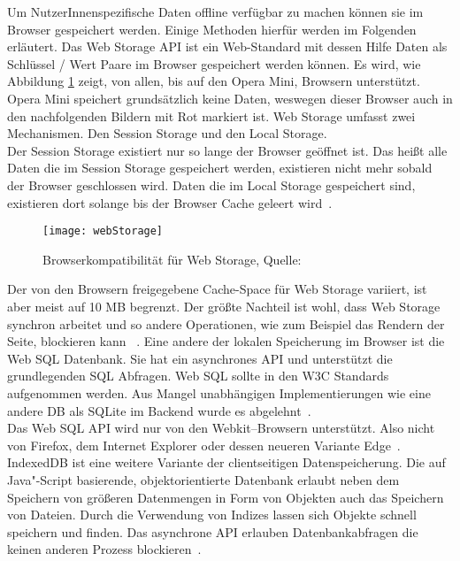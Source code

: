 Um NutzerInnenspezifische Daten offline verfügbar zu machen können sie im Browser gespeichert werden. Einige Methoden hierfür werden im Folgenden erläutert.
%
Das Web Storage \gls{API} ist ein Web-Standard mit dessen Hilfe Daten als Schlüssel / Wert Paare im Browser gespeichert werden können. Es wird, wie Abbildung \ref{fig:webStorage} zeigt, von allen, bis auf den Opera Mini,  Browsern unterstützt. Opera Mini speichert grundsätzlich keine Daten, weswegen dieser Browser auch in den nachfolgenden Bildern mit Rot markiert ist.
Web Storage umfasst zwei Mechanismen. Den Session Storage und den Local Storage.\\
Der Session Storage existiert nur so lange der Browser geöffnet ist.
Das heißt alle Daten die im Session Storage gespeichert werden, existieren nicht mehr sobald der Browser geschlossen wird. Daten die im Local Storage gespeichert sind, existieren dort solange bis der Browser Cache geleert wird~\cite{webstorage}.
\begin{figure}[H]
	\centering
	\texttt{[image: webStorage]}
	\grayRule
	\caption{Browserkompatibilität für Web Storage, Quelle: ~\cite{caniuse-ws}}
	\label{fig:webStorage}
\end{figure}
Der von den Browsern freigegebene Cache-Space für Web Storage variiert, ist aber meist auf 10 MB begrenzt. Der größte Nachteil ist wohl, dass Web Storage synchron arbeitet und so andere Operationen, wie zum Beispiel das Rendern der Seite, blockieren kann ~\cite{webstorage-con}.
%
%
Eine andere der lokalen Speicherung im Browser ist die Web SQL Datenbank.
Sie hat ein asynchrones \gls{API} und unterstützt die grundlegenden SQL Abfragen. Web SQL sollte in den W3C Standards aufgenommen werden. Aus Mangel unabhängigen Implementierungen wie eine andere \gls{DB} als SQLite im Backend wurde es abgelehnt~\cite{websql}.\\
Das Web SQL \gls{API} wird nur von den Webkit--Browsern unterstützt. Also nicht von Firefox, dem Internet Explorer oder dessen neueren Variante Edge~\cite{caniuse-websql}.
%
%
IndexedDB ist eine weitere Variante der clientseitigen Datenspeicherung. Die auf Java"-Script basierende, objektorientierte Datenbank erlaubt neben dem Speichern von größeren Datenmengen in Form von Objekten auch das Speichern von Dateien. Durch die Verwendung von Indizes lassen sich Objekte schnell speichern und finden. Das asynchrone \gls{API} erlauben Datenbankabfragen die keinen anderen Prozess blockieren~\cite{idb}.
